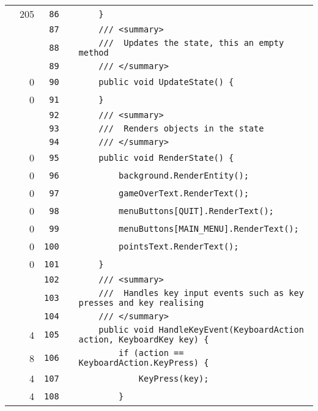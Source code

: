 \documentclass[a4paper,landscape,10pt]{article}
\begin{document}
\begin{longtable}[l]{lrrll}
\cellcolor{green} & 205 & \verb~86~ & & \verb~    }~\\
\cellcolor{gray} &  & \verb~87~ & & \verb~    /// <summary>~\\
\cellcolor{gray} &  & \verb~88~ & & \verb~    ///  Updates the state, this an empty method~\\
\cellcolor{gray} &  & \verb~89~ & & \verb~    /// </summary>~\\
\cellcolor{red} & 0 & \verb~90~ & & \verb~    public void UpdateState() {~\\
\cellcolor{red} & 0 & \verb~91~ & & \verb~    }~\\
\cellcolor{gray} &  & \verb~92~ & & \verb~    /// <summary>~\\
\cellcolor{gray} &  & \verb~93~ & & \verb~    ///  Renders objects in the state~\\
\cellcolor{gray} &  & \verb~94~ & & \verb~    /// </summary>~\\
\cellcolor{red} & 0 & \verb~95~ & & \verb~    public void RenderState() {~\\
\cellcolor{red} & 0 & \verb~96~ & & \verb~        background.RenderEntity();~\\
\cellcolor{red} & 0 & \verb~97~ & & \verb~        gameOverText.RenderText();~\\
\cellcolor{red} & 0 & \verb~98~ & & \verb~        menuButtons[QUIT].RenderText();~\\
\cellcolor{red} & 0 & \verb~99~ & & \verb~        menuButtons[MAIN_MENU].RenderText();~\\
\cellcolor{red} & 0 & \verb~100~ & & \verb~        pointsText.RenderText();~\\
\cellcolor{red} & 0 & \verb~101~ & & \verb~    }~\\
\cellcolor{gray} &  & \verb~102~ & & \verb~    /// <summary>~\\
\cellcolor{gray} &  & \verb~103~ & & \verb~    ///  Handles key input events such as key presses and key realising~\\
\cellcolor{gray} &  & \verb~104~ & & \verb~    /// </summary>~\\
\cellcolor{green} & 4 & \verb~105~ & & \verb~    public void HandleKeyEvent(KeyboardAction action, KeyboardKey key) {~\\
\cellcolor{green} & 8 & \verb~106~ & & \verb~        if (action == KeyboardAction.KeyPress) {~\\
\cellcolor{green} & 4 & \verb~107~ & & \verb~            KeyPress(key);~\\
\cellcolor{green} & 4 & \verb~108~ & & \verb~        }~\\

\end{longtable}
\end{document}
